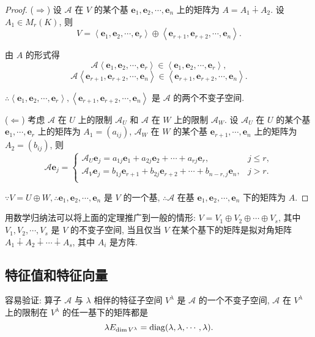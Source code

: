 \documentclass[color=black,device=normal,lang=cn,mode=geye]{elegantnote}
\begin{document}
\begin{proof}
    ($\Rightarrow$) 设 $\mathcal{A}$ 在 $V$ 的某个基 $\boldsymbol{e}_1,\boldsymbol{e}_2,\cdots,\boldsymbol{e}_n$ 上的矩阵为 $A=A_1\dotplus A_2$. 设 $A_1\in M_r(K)$, 则
    \[V=\left<\boldsymbol{e}_1,\boldsymbol{e}_2,\cdots,\boldsymbol{e}_r\right>\oplus\left<\boldsymbol{e}_{r+1},\boldsymbol{e}_{r+2},\cdots,\boldsymbol{e}_n\right>.\]

    由 $A$ 的形式得
    \[\mathcal{A}\left<\boldsymbol{e}_1,\boldsymbol{e}_2,\cdots,\boldsymbol{e}_r\right>\in\left<\boldsymbol{e}_1,\boldsymbol{e}_2,\cdots,\boldsymbol{e}_r\right>,\]
    \[\mathcal{A}\left<\boldsymbol{e}_{r+1},\boldsymbol{e}_{r+2},\cdots,\boldsymbol{e}_n\right>\in\left<\boldsymbol{e}_{r+1},\boldsymbol{e}_{r+2},\cdots,\boldsymbol{e}_n\right>.\]

    $\therefore\left<\boldsymbol{e}_1,\boldsymbol{e}_2,\cdots,\boldsymbol{e}_r\right>,\left<\boldsymbol{e}_{r+1},\boldsymbol{e}_{r+2},\cdots,\boldsymbol{e}_n\right>$ 是 $\mathcal{A}$ 的两个不变子空间.

    ($\Leftarrow$) 考虑 $\mathcal{A}$ 在 $U$ 上的限制 $\mathcal{A}_U$ 和 $\mathcal{A}$ 在 $W$ 上的限制 $\mathcal{A}_W$. 设 $\mathcal{A}_U$ 在 $U$ 的某个基 $\boldsymbol{e}_1,\cdots,\boldsymbol{e}_r$ 上的矩阵为 $A_1=(a_{ij})$, $\mathcal{A}_W$ 在 $W$ 的某个基 $\boldsymbol{e}_{r+1},\cdots,\boldsymbol{e}_n$ 上的矩阵为 $A_2=(b_{ij})$, 则
    \[\mathcal{A}\boldsymbol{e}_j=\begin{cases}
        \mathcal{A}_U\boldsymbol{e}_j=a_{1j}\boldsymbol{e}_1+a_{2j}\boldsymbol{e}_2+\cdots+a_{rj}\boldsymbol{e}_r, & j\leq r, \\
        \mathcal{A}_V\boldsymbol{e}_j=b_{1j}\boldsymbol{e}_{r+1}+b_{2j}\boldsymbol{e}_{r+2}+\cdots+b_{n-r,j}\boldsymbol{e}_n, & j>r. \\
    \end{cases}\]
    
    $\because V=U\oplus W,\therefore\boldsymbol{e}_1,\boldsymbol{e}_2,\cdots,\boldsymbol{e}_n$ 是 $V$ 的一个基, $\therefore\mathcal{A}$ 在基 $\boldsymbol{e}_1,\boldsymbol{e}_2,\cdots,\boldsymbol{e}_n$ 下的矩阵为 $A$.
\end{proof}
用数学归纳法可以将上面的定理推广到一般的情形: $V=V_1\oplus V_2\oplus\cdots\oplus V_s$, 其中 $V_1,V_2,\cdots,V_s$ 是 $V$ 的不变子空间, 当且仅当 $V$ 在某个基下的矩阵是拟对角矩阵 $A_1\dotplus A_2\dotplus\cdots\dotplus A_s$, 其中 $A_i$ 是方阵.
\subsection{特征值和特征向量}
容易验证: 算子 $\mathcal{A}$ 与 $\lambda$ 相伴的特征子空间 $V^\lambda$ 是 $\mathcal{A}$ 的一个不变子空间, $\mathcal{A}$ 在 $V^\lambda$ 上的限制在 $V^\lambda$ 的任一基下的矩阵都是
\[\lambda E_{\dim V^\lambda}=\operatorname{diag}(\lambda,\lambda,\cdots,\lambda).\]
\end{document}
